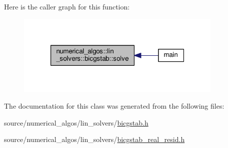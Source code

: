Here is the caller graph for this function\-:\nopagebreak
\begin{figure}[H]
\begin{center}
\leavevmode
\includegraphics[width=280pt]{classnumerical__algos_1_1lin__solvers_1_1bicgstab_ac3df95058825e4a8a1ed6bf838f10669_icgraph}
\end{center}
\end{figure}




The documentation for this class was generated from the following files\-:\begin{DoxyCompactItemize}
\item 
source/numerical\-\_\-algos/lin\-\_\-solvers/\hyperlink{bicgstab_8h}{bicgstab.\-h}\item 
source/numerical\-\_\-algos/lin\-\_\-solvers/\hyperlink{bicgstab__real__resid_8h}{bicgstab\-\_\-real\-\_\-resid.\-h}\end{DoxyCompactItemize}
